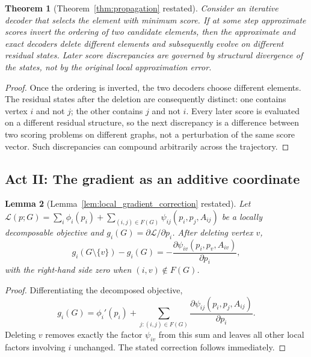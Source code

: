 \documentclass[11pt]{article}
\theoremstyle{plain}
\newtheorem{theorem}{Theorem}[section]
\newtheorem{lemma}[theorem]{Lemma}
\theoremstyle{remark}
\begin{document}
\begin{theorem}[Theorem~\ref{thm:propagation} restated]
  Consider an iterative decoder that selects the element with minimum score. If at
  some step approximate scores invert the ordering of two candidate elements, then
  the approximate and exact decoders delete different elements and subsequently
  evolve on different residual states. Later score discrepancies are governed by
  structural divergence of the states, not by the original local approximation
  error.
\end{theorem}
\begin{proof}
  Once the ordering is inverted, the two decoders choose different elements. The
  residual states after the deletion are consequently distinct: one contains vertex
  $i$ and not $j$; the other contains $j$ and not $i$. Every later score is
  evaluated on a different residual structure, so the next discrepancy is a
  difference between two scoring problems on different graphs, not a perturbation of
  the same score vector. Such discrepancies can compound arbitrarily across the
  trajectory.
\end{proof}

\subsection*{Act II: The gradient as an additive coordinate}

\begin{lemma}[Lemma~\ref{lem:local_gradient_correction} restated]
  Let $\mathcal{L}(p;G) = \sum_i \phi_i(p_i) + \sum_{(i,j)\in
  F(G)}\psi_{ij}(p_i,p_j,A_{ij})$ be a locally decomposable objective and
  $g_i(G) = \partial\mathcal{L}/\partial p_i$. After deleting vertex $v$,
  \[
    g_i(G\setminus\{v\}) - g_i(G)
    =
    -\frac{\partial \psi_{iv}(p_i,p_v,A_{iv})}{\partial p_i},
  \]
  with the right-hand side zero when $(i,v)\notin F(G)$.
\end{lemma}
\begin{proof}
  Differentiating the decomposed objective,
  \[
    g_i(G) = \phi_i'(p_i)
    + \sum_{j:(i,j)\in F(G)} \frac{\partial \psi_{ij}(p_i,p_j,A_{ij})}{\partial p_i}.
  \]
  Deleting $v$ removes exactly the factor $\psi_{iv}$ from this sum and leaves all
  other local factors involving $i$ unchanged. The stated correction follows
  immediately.
\end{proof}
\end{document}
